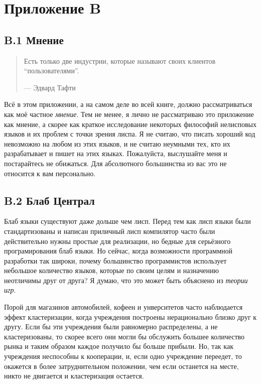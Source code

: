 \chapter*{Приложение B}

\section*{B.1 Мнение}

\begin{quote}
Есть только две индустрии, которые называют своих клиентов ``пользователями''.

--- Эдвард Тафти
\end{quote}

Всё в этом приложении, а на самом деле во всей книге, должно рассматриваться как моё частное \emph{мнение}. Тем не менее, я лично не рассматриваю это приложение как мнение, а скорее как краткое исследование некоторых философий нелисповых языков и их проблем с точки зрения лиспа. Я не считаю, что писать хороший код невозможно на любом из этих языков, и не считаю неумными тех, кто их разрабатывает и пишет на этих языках. Пожалуйста, выслушайте меня и постарайтесь не обижаться. Для абсолютного большинства из вас это не относится к вам персонально.

\section*{B.2 Блаб Централ}

Блаб языки существуют даже дольше чем лисп. Перед тем как лисп языки были стандартизованы и написан приличный лисп компилятор часто были действительно нужны простые для реализации, но бедные для серьёзного програмирования блаб языки. Но сейчас, когда возможности программной разработки так широки, почему большинство программистов использует небольшое количество языков, которые по своим целям и назначению неотличимы друг от друга? Я думаю, что это может быть объяснено из \emph{теории игр}.

Порой для магазинов автомобилей, кофеен и унверситетов часто наблюдается эффект кластеризации, когда учреждения построены нерационально близко друг к другу. Если бы эти учреждения были равномерно распределены, а не кластеризованы, то скорее всего они могли бы обслужить большее количество рынка и таким образом каждое получило бы больше прибыли. Но, так как учреждения неспособны к кооперации, и, если одно учреждение переедет, то окажется в более затруднительном положении, чем если останется на месте, никто не двигается и кластеризация остается.

